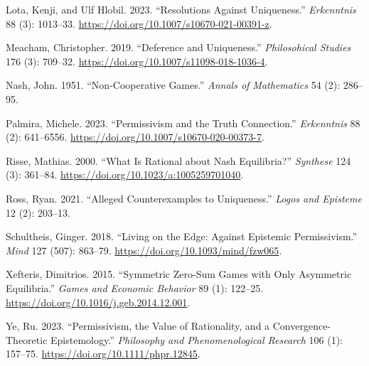 \documentclass[
  11pt,
]{article}
\newlength{\cslhangindent}
\newenvironment{CSLReferences}[2] %
 {\begin{list}{}{%
  \setlength{\itemindent}{0pt}
  \setlength{\leftmargin}{0pt}
  \setlength{\parsep}{0pt}
  \ifodd #1
   \setlength{\leftmargin}{\cslhangindent}
   \setlength{\itemindent}{-1\cslhangindent}
  \fi
  \setlength{\itemsep}{#2\baselineskip}}}
 {\end{list}}
\begin{document}
\begin{CSLReferences}{1}{0}
Lota, Kenji, and Ulf Hlobil. 2023. {``Resolutions Against Uniqueness.''} \emph{Erkenntnis} 88 (3): 1013--33. \url{https://doi.org/10.1007/s10670-021-00391-z}.

Meacham, Christopher. 2019. {``Deference and Uniqueness.''} \emph{Philosohical Studies} 176 (3): 709--32. \url{https://doi.org/10.1007/s11098-018-1036-4}.

Nash, John. 1951. {``Non-Cooperative Games.''} \emph{Annals of Mathematics} 54 (2): 286--95.

Palmira, Michele. 2023. {``Permissivism and the Truth Connection.''} \emph{Erkenntnis} 88 (2): 641--6556. \url{https://doi.org/10.1007/s10670-020-00373-7}.

Risse, Mathias. 2000. {``What Is Rational about Nash Equilibria?''} \emph{Synthese} 124 (3): 361--84. \url{https://doi.org/10.1023/a:1005259701040}.

Ross, Ryan. 2021. {``Alleged Counterexamples to Uniqueness.''} \emph{Logos and Episteme} 12 (2): 203--13.

Schultheis, Ginger. 2018. {``Living on the Edge: Against Epistemic Permissivism.''} \emph{Mind} 127 (507): 863--79. \url{https://doi.org/10.1093/mind/fzw065}.

Xefteris, Dimitrios. 2015. {``Symmetric Zero-Sum Games with Only Asymmetric Equilibria.''} \emph{Games and Economic Behavior} 89 (1): 122--25. \url{https://doi.org/10.1016/j.geb.2014.12.001}.

Ye, Ru. 2023. {``Permissivism, the Value of Rationality, and a Convergence-Theoretic Epistemology.''} \emph{Philosophy and Phenomenological Research} 106 (1): 157--75. \url{https://doi.org/10.1111/phpr.12845}.

\end{CSLReferences}
\end{document}
